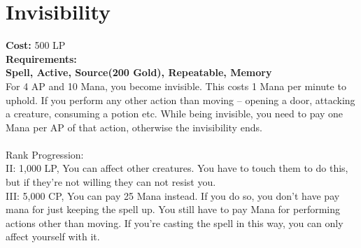 \section{Invisibility}\label{spell:invisibility}
\textbf{Cost:} 500 LP\\
\textbf{Requirements:}\\
\textbf{Spell, Active, Source(200 Gold), Repeatable, Memory}\\
For 4 AP and 10 Mana, you become invisible.
This costs 1 Mana per minute to uphold.
If you perform any other action than moving -- opening a door, attacking a creature, consuming a potion etc.
While being invisible, you need to pay one Mana per AP of that action, otherwise the invisibility ends.\\
\\
Rank Progression:\\
II: 1,000 LP, You can affect other creatures.
You have to touch them to do this, but if they're not willing they can not resist you.\\

III: 5,000 CP, You can pay 25 Mana instead.
If you do so, you don't have pay mana for just keeping the spell up.
You still have to pay Mana for performing actions other than moving.
If you're casting the spell in this way, you can only affect yourself with it.\\